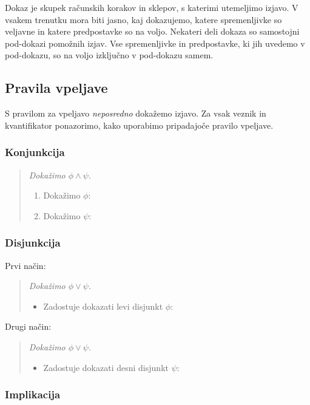 Dokaz je skupek računskih korakov in sklepov, s katerimi utemeljimo izjavo. V vsakem
trenutku mora biti jasno, kaj dokazujemo, katere spremenljivke so veljavne in katere
predpostavke so na voljo.
%
Nekateri deli dokaza so samostojni pod-dokazi pomožnih izjav. Vse spremenljivke in
predpostavke, ki jih uvedemo v pod-dokazu, so na voljo izključno v pod-dokazu samem.

\subsection{Pravila vpeljave}
\label{sec:pravila-vpeljave}

S pravilom za vpeljavo \emph{neposredno} dokažemo izjavo. Za vsak veznik in kvantifikator ponazorimo, kako uporabimo
pripadajoče pravilo vpeljave.

\subsubsection{Konjunkcija}
%
\begin{quote}
  \sl
  Dokažimo $\phi \land \psi$.
  \begin{enumerate}
  \item Dokažimo $\phi$: \quad {}
  \item Dokažimo $\psi$: \quad {}
  \end{enumerate}
\end{quote}

\subsubsection{Disjunkcija}

Prvi način:
%
\begin{quote}
  \sl
  Dokažimo $\phi \lor \psi$.
  \begin{itemize}
  \item[] Zadostuje dokazati levi disjunkt $\phi$: \quad {}
  \end{itemize}
\end{quote}
%
Drugi način:
%
\begin{quote}
  \sl
  Dokažimo $\phi \lor \psi$.
  \begin{itemize}
  \item[] Zadostuje dokazati desni disjunkt $\psi$: \quad {}
  \end{itemize}
\end{quote}

\subsubsection{Implikacija}

